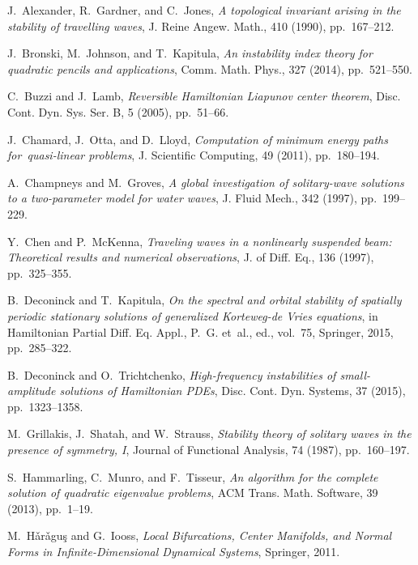 \documentclass[review,onefignum,onetabnum]{siamart171218}
\begin{document}
\begin{thebibliography}{10}

{\sc J.~Alexander, R.~Gardner, and C.~Jones}, {\em A topological invariant
  arising in the stability of travelling waves}, J. Reine Angew. Math., 410
  (1990), pp.~167--212.

{\sc J.~Bronski, M.~Johnson, and T.~Kapitula}, {\em An instability index theory
  for quadratic pencils and applications}, Comm. Math. Phys., 327 (2014),
  pp.~521--550.

{\sc C.~Buzzi and J.~Lamb}, {\em Reversible {H}amiltonian {L}iapunov center
  theorem}, Disc. Cont. Dyn. Sys. Ser. B, 5 (2005), pp.~51--66.

{\sc J.~Chamard, J.~Otta, and D.~Lloyd}, {\em Computation of minimum energy
  paths for~quasi-linear problems}, J. Scientific Computing, 49 (2011),
  pp.~180--194.

{\sc A.~Champneys and M.~Groves}, {\em A global investigation of solitary-wave
  solutions to a two-parameter model for water waves}, J. Fluid Mech., 342
  (1997), pp.~199--229.

{\sc Y.~Chen and P.~McKenna}, {\em Traveling waves in a nonlinearly suspended
  beam: Theoretical results and numerical observations}, J. of Diff. Eq., 136
  (1997), pp.~325--355.

{\sc B.~Deconinck and T.~Kapitula}, {\em On the spectral and orbital stability
  of spatially periodic stationary solutions of generalized {K}orteweg-de
  {V}ries equations}, in Hamiltonian Partial Diff. Eq. Appl., P.~G. et~al.,
  ed., vol.~75, Springer, 2015, pp.~285--322.

{\sc B.~Deconinck and O.~Trichtchenko}, {\em High-frequency instabilities of
  small-amplitude solutions of {H}amiltonian {PDE}s}, Disc. Cont. Dyn. Systems,
  37 (2015), pp.~1323--1358.

{\sc M.~Grillakis, J.~Shatah, and W.~Strauss}, {\em Stability theory of
  solitary waves in the presence of symmetry, {I}}, Journal of Functional
  Analysis, 74 (1987), pp.~160--197.

{\sc S.~Hammarling, C.~Munro, and F.~Tisseur}, {\em An algorithm for the
  complete solution of quadratic eigenvalue problems}, {ACM} Trans. Math.
  Software, 39 (2013), pp.~1--19.

{\sc M.~H\v{a}r\v{a}gu\c{s} and G.~Iooss}, {\em Local Bifurcations, Center
  Manifolds, and Normal Forms in Infinite-Dimensional Dynamical Systems},
  Springer, 2011.


\end{thebibliography}
\end{document}

